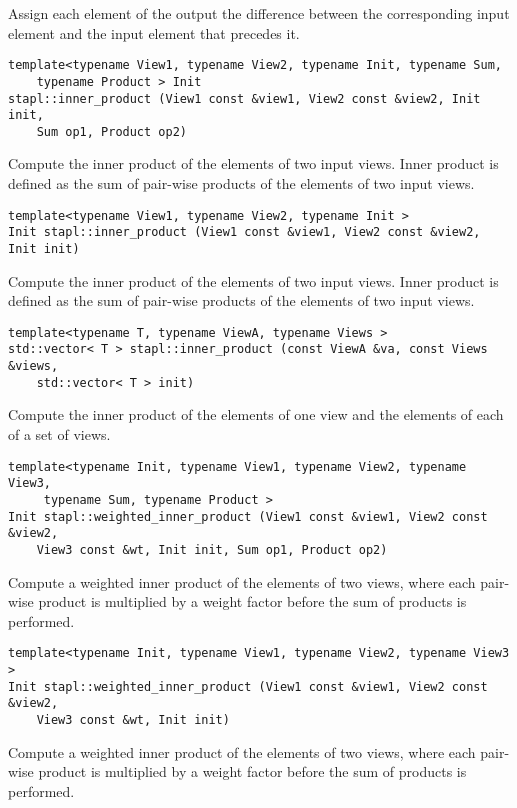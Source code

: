 Assign each element of the output the difference between the corresponding input element and the input element that precedes it.

\begin{verbatim}
template<typename View1, typename View2, typename Init, typename Sum,
    typename Product > Init
stapl::inner_product (View1 const &view1, View2 const &view2, Init init,
    Sum op1, Product op2)
\end{verbatim}

Compute the inner product of the elements of two input views. Inner product is defined as the sum of pair-wise products of the elements of two input views.

\begin{verbatim}
template<typename View1, typename View2, typename Init >
Init stapl::inner_product (View1 const &view1, View2 const &view2, Init init)
\end{verbatim}

Compute the inner product of the elements of two input views. Inner product is defined as the sum of pair-wise products of the elements of two input views.

\begin{verbatim}
template<typename T, typename ViewA, typename Views >
std::vector< T > stapl::inner_product (const ViewA &va, const Views &views,
    std::vector< T > init)
\end{verbatim}

Compute the inner product of the elements of one view and the elements of each of a set of views.

\begin{verbatim}
template<typename Init, typename View1, typename View2, typename View3,
     typename Sum, typename Product >
Init stapl::weighted_inner_product (View1 const &view1, View2 const &view2,
    View3 const &wt, Init init, Sum op1, Product op2)
\end{verbatim}

Compute a weighted inner product of the elements of two views, where each pair-wise product is multiplied by a weight factor before the sum of products is performed.

\begin{verbatim}
template<typename Init, typename View1, typename View2, typename View3 >
Init stapl::weighted_inner_product (View1 const &view1, View2 const &view2,
    View3 const &wt, Init init)
\end{verbatim}

Compute a weighted inner product of the elements of two views, where each pair-wise product is multiplied by a weight factor before the sum of products is performed.

